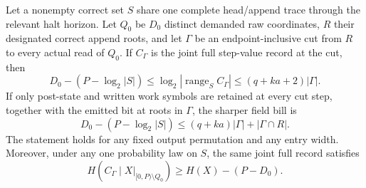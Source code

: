 \begin{proposition}\label{prop:frozen-invoice}
Let a nonempty correct set $S$ share one complete head/append trace through
the relevant halt horizon. Let $Q_0$ be $D_0$ distinct demanded raw
coordinates, $R$ their designated correct append roots, and let $\Gamma$
be an endpoint-inclusive cut from $R$ to every actual read of $Q_0$.
If $C_\Gamma$ is the joint full step-value record at the cut, then
\[
 D_0-(P-\log_2|S|)
 \le\log_2|\operatorname{range}_S C_\Gamma|
 \le(q+ka+2)|\Gamma|.
\]
If only post-state and written work symbols are retained at every cut
step, together with the emitted bit at roots in $\Gamma$, the sharper
field bill is
\[
 D_0-(P-\log_2|S|)\le(q+ka)|\Gamma|+|\Gamma\cap R|.
\]
The statement holds for any fixed output permutation and any entry width.
Moreover, under any one probability law on $S$, the same joint full record
satisfies
\[
 H(C_\Gamma\mid X|_{[0,P)\setminus Q_0})
 \ge H(X)-(P-D_0).
\]
\end{proposition}
